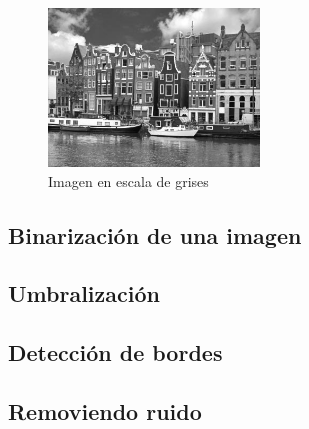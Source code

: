 \begin{figure}[htbp]
    \centering
    \includegraphics[width=0.5\textwidth]{images/ch7/holland_gris.png}
    \caption{Imagen en escala de grises}
    \label{fig:holland_gris}
\end{figure}

\subsection{Binarización de una imagen}

\subsection{Umbralización}\label{umbralizaciuxf3n}

\subsection{Detección de bordes}\label{detecciuxf3n-de-bordes}

\subsection{Removiendo ruido}\label{removiendo-ruido}